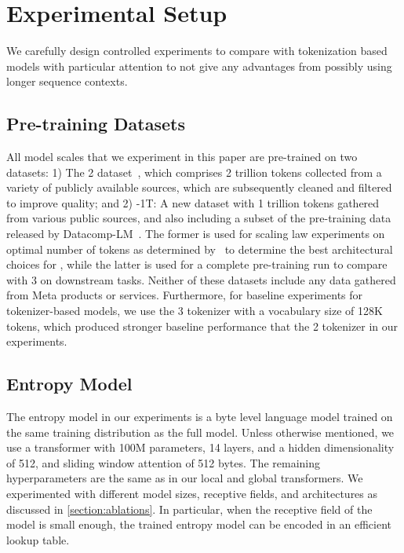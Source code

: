 \documentclass[]{fairmeta}
\begin{document}
\section{Experimental Setup}
\label{section:experiments}
We carefully design controlled experiments to compare \model{} with tokenization based models with particular attention to not give \model{} any advantages from possibly using longer sequence contexts. 

\subsection{Pre-training Datasets}
All model scales that we experiment in this paper are pre-trained on two datasets: 1) The \llama{} 2 dataset~\citep{touvron2023llama}, which comprises 2 trillion tokens collected from a variety of publicly available sources, which are subsequently cleaned and filtered to improve quality; and 2) \model{}-1T: A new dataset with 1 trillion tokens gathered from various public sources, and also including a subset of the pre-training data released by Datacomp-LM~\citep{li2024datacomp}. The former is used for scaling law experiments on optimal number of tokens as determined by~\cite{dubey2024llama} to determine the best architectural choices for \model{}, while the latter is used for a complete pre-training run to compare with \llama{} 3 on downstream tasks. Neither of these datasets include any data gathered from Meta products or services.
Furthermore, for baseline experiments for tokenizer-based models, we use the \llama{} 3 tokenizer with a vocabulary size of 128K tokens, which produced stronger baseline performance that the \llama{} 2 tokenizer in our experiments.

\subsection{Entropy Model}
The entropy model in our experiments is a byte level language model trained on the same training distribution as the full \model{} model. Unless otherwise mentioned, we use a transformer with 100M parameters, 14 layers, and a hidden dimensionality of 512, and sliding window attention of 512 bytes. The remaining hyperparameters are the same as in our local and global transformers. We  experimented with different model sizes, receptive fields, and architectures as discussed in \autoref{section:ablations}. In particular, when the receptive field of the model is small enough, the trained entropy model can be encoded in an efficient lookup table.
\end{document}
